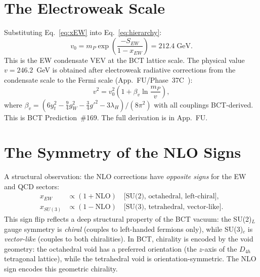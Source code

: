 \documentclass[aps,prl,twocolumn,showpacs,preprintnumbers]{revtex4-2}
\newcommand{\mP}{m_P}
\newcommand{\NLO}{\mathrm{NLO}}
\begin{document}
\section{The Electroweak Scale}

Substituting Eq.~\eqref{eq:xEW} into Eq.~\eqref{eq:hierarchy}:
\begin{equation}
  v_0 = \mP\exp\!\left(\frac{-S_{EW}}{1-x_{EW}}\right)
  = 212.4\;\text{GeV}.
  \label{eq:v0}
\end{equation}
This is the EW condensate VEV at the BCT lattice scale.
The physical value $v = 246.2$~GeV is obtained after
electroweak radiative corrections from the condensate scale
to the Fermi scale (App.~FU/Phase~37C~\cite{appFU}):
\begin{equation}
  v^2 = v_0^2\left(1 + \beta_v\ln\frac{\mP}{v}\right),
  \label{eq:v_running}
\end{equation}
where $\beta_v = (6y_t^2 - \frac{9}{4}g_W^2 - \frac{3}{4}g'^2 -
3\lambda_H)/(8\pi^2)$ with all couplings BCT-derived.
This is BCT Prediction~\#169. The full derivation is in App.~FU.

\section{The Symmetry of the NLO Signs}

A structural observation: the NLO corrections have \emph{opposite
signs} for the EW and QCD sectors:
\begin{align}
  x_{EW}   &\propto (1 + \NLO) \quad \text{[SU(2), octahedral, left-chiral]},\\
  x_{SU(3)}&\propto (1 - \NLO) \quad \text{[SU(3), tetrahedral, vector-like]}.
\end{align}
This sign flip reflects a deep structural property of the BCT vacuum:
the SU(2)$_L$ gauge symmetry is \emph{chiral} (couples to left-handed
fermions only), while SU(3)$_c$ is \emph{vector-like} (couples to
both chiralities). In BCT, chirality is encoded by the void geometry:
the octahedral void has a preferred orientation (the $z$-axis of the
$D_{4h}$ tetragonal lattice), while the tetrahedral void is
orientation-symmetric. The NLO sign encodes this geometric chirality.

\end{document}
